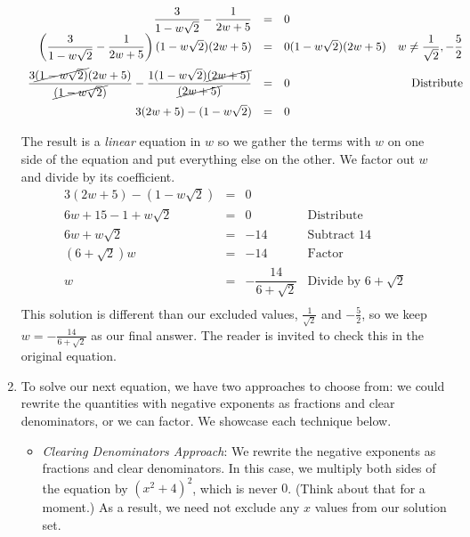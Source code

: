 \begin{ex}
\begin{enumerate}
\[\begin{array}{rclr}
 \dfrac{3}{1 - w\sqrt{2}} - \dfrac{1}{2w+5} & = &  0 & \\

\left(\dfrac{3}{1 - w\sqrt{2}} - \dfrac{1}{2w+5}\right)(1 - w\sqrt{2})(2w+5) & = &  0 (1 - w\sqrt{2})(2w+5)  & w \neq \dfrac{1}{\sqrt{2}}, -\dfrac{5}{2} \\ [12pt]

\dfrac{3\cancel{(1 - w\sqrt{2})}(2w+5) }{\cancel{(1 - w\sqrt{2})}}- \dfrac{1(1 - w\sqrt{2})\cancel{(2w+5)}}{\cancel{(2w+5)}} & = & 0 & \text{Distribute} \\ [12pt]

3(2w+5) - (1-w\sqrt{2}) & = & 0 & \\  \end{array}\]

The result is a \textit{linear} equation in $w$ so we gather the terms with $w$ on one side of the equation and put everything else on the other.  We factor out $w$ and divide by its coefficient. \[ \begin{array}{rclr}

3(2w+5) - (1-w\sqrt{2}) & = & 0 & \\

6w + 15 - 1 + w\sqrt{2} & = & 0 & \text{Distribute} \\

6w + w\sqrt{2} & = & -14 & \text{Subtract $14$} \\

(6 + \sqrt{2})w & = & -14 & \text{Factor} \\

w & = & -\dfrac{14}{6 + \sqrt{2}} & \text{Divide by $6 + \sqrt{2}$} \\ 

\end{array}\] This solution is different than our excluded values, $\frac{1}{\sqrt{2}}$ and $-\frac{5}{2}$, so we keep $w = -\frac{14}{6 + \sqrt{2}}$ as our final answer.  The reader is invited to check this in the original equation.

\item  To solve our next equation, we have two approaches to choose from:  we could rewrite the quantities with negative exponents as fractions and clear denominators, or we can factor.  We showcase each technique below.

\begin{itemize}

\item \textit{Clearing Denominators Approach}:  We rewrite the negative exponents as fractions and clear denominators.  In this case, we multiply both sides of the equation by $(x^2+4)^2$, which is never $0$. (Think about that for a moment.)  As a result, we need not exclude any $x$ values from our solution set.\[ \begin{array}{rclr}


\end{array}\]
\end{itemize}
\end{enumerate}
\end{ex}
